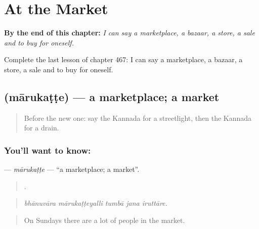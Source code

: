 
\chapter{At the Market}
\label{ch:ka-at-the-market}

\begin{chapteropening}
\textbf{By the end of this chapter:} \emph{I can say a marketplace, a bazaar, a store, a sale and to buy for oneself.}

Complete the last lesson of chapter 467: I can say a marketplace, a bazaar, a store, a sale and to buy for oneself.
\end{chapteropening}

\section[\texorpdfstring{\kn{ಮಾರುಕಟ್ಟೆ} (mārukaṭṭe)}{ಮಾರುಕಟ್ಟೆ (mārukaṭṭe)}]{ (mārukaṭṭe) — a marketplace; a market}

\label{lesson:KA-C467-marukatte}



\begin{quote}
Before the new one: say the Kannada for a streetlight, then the Kannada for a drain.
\end{quote}

\subsection*{You'll want to know: }
\textbf{} — \emph{mārukaṭṭe} — \textquotedblleft{}a marketplace; a market\textquotedblright{}.

\begin{quote}
    .
\end{quote}

\begin{quote}
\emph{bhānuvāra mārukaṭṭeyalli tumbā jana iruttāre.}
\end{quote}

\begin{quote}
On Sundays there are a lot of people in the market.
\end{quote}

